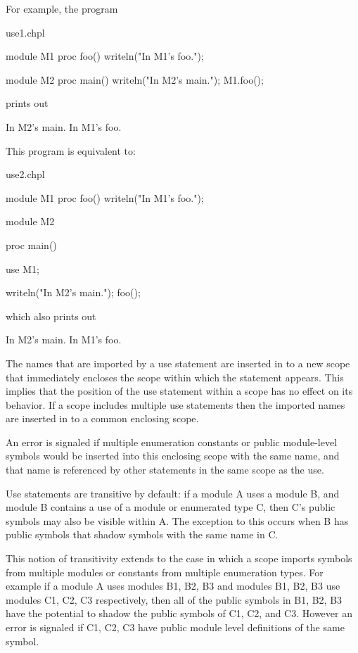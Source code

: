 For example, the program
\begin{chapelexample}{use1.chpl}
\begin{chapel}
module M1 {
  proc foo() {
    writeln("In M1's foo.");
  }
}

module M2 {
  proc main() {
    writeln("In M2's main.");
    M1.foo();
  }
}
\end{chapel}
prints out
\begin{chapelprintoutput}{}
In M2's main.
In M1's foo.
\end{chapelprintoutput}
\end{chapelexample}

This program is equivalent to:
\begin{chapelexample}{use2.chpl}
\begin{chapel}
module M1 {
  proc foo() {
    writeln("In M1's foo.");
  }
}

module M2 {
  proc main() {
    use M1;

    writeln("In M2's main.");
    foo();
  }
}
\end{chapel}

which also prints out
\begin{chapelprintoutput}{}
In M2's main.
In M1's foo.
\end{chapelprintoutput}
\end{chapelexample}

The names that are imported by a use statement are inserted in to a
new scope that immediately encloses the scope within which the
statement appears.  This implies that the position of the use
statement within a scope has no effect on its behavior.  If a scope
includes multiple use statements then the imported names are inserted
in to a common enclosing scope.

An error is signaled if multiple enumeration constants or public module-level
symbols would be inserted into this enclosing scope with the same name, and
that name is referenced by other statements in the same scope as the use.


Use statements are transitive by default: if a module A uses a module
B, and module B contains a use of a module or enumerated type C, then
C's public symbols may also be visible within A.  The exception to
this occurs when B has public symbols that shadow symbols with the
same name in C.

This notion of transitivity extends to the case in which a scope
imports symbols from multiple modules or constants from multiple
enumeration types.  For example if a module A uses modules B1, B2, B3
and modules B1, B2, B3 use modules C1, C2, C3 respectively, then all
of the public symbols in B1, B2, B3 have the potential to shadow the
public symbols of C1, C2, and C3.  However an error is signaled if
C1, C2, C3 have public module level definitions of the same symbol.

